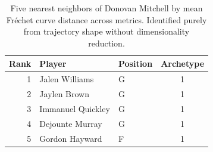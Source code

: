 \begin{table}[htbp]
  \centering\small
  \begin{tabular}{rllc}
    \toprule
    Rank & Player & Position & Archetype \\
    \midrule
    1 & Jalen Williams & G & 1 \\
    2 & Jaylen Brown & G & 1 \\
    3 & Immanuel Quickley & G & 1 \\
    4 & Dejounte Murray & G & 1 \\
    5 & Gordon Hayward & F & 1 \\
    \bottomrule
  \end{tabular}
  \caption{Five nearest neighbors of Donovan Mitchell by mean Fr\'{e}chet curve distance across metrics. Identified purely from trajectory shape without dimensionality reduction.}
  \label{tab:Donovan_Mitchell_frechet_curve_neighbors}
\end{table}

